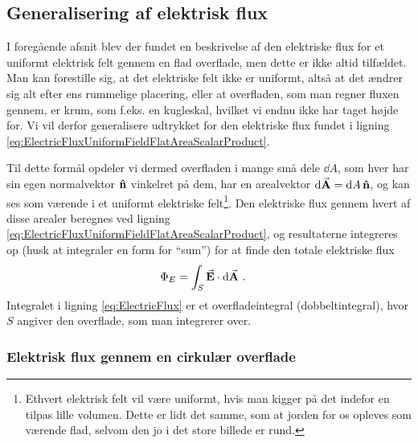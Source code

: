 \subsection{Generalisering af elektrisk flux}

I foregående afsnit blev der fundet en beskrivelse af den elektriske flux for et uniformt elektrisk felt gennem en flad overflade, men dette er ikke altid tilfældet. Man kan forestille sig, at det elektriske felt ikke er uniformt, altså at det ændrer sig alt efter ens rummelige placering, eller at overfladen, som man regner fluxen gennem, er krum, som f.eks. en kugleskal, hvilket vi endnu ikke har taget højde for. Vi vil derfor generalisere udtrykket for den elektriske flux fundet i ligning \eqref{eq:ElectricFluxUniformFieldFlatAreaScalarProduct}.

Til dette formål opdeler vi dermed overfladen i mange små dele $\dd{A}$, som hver har sin egen normalvektor $\vu{n}$ vinkelret på dem, har en arealvektor $\dd{\va{A}} = \dd{A}\vu{n}$, og kan ses som værende i et uniformt elektriske felt\footnote{Ethvert elektrisk felt vil være uniformt, hvis man kigger på det indefor en tilpas lille volumen. Dette er lidt det samme, som at jorden for os opleves som værende flad, selvom den jo i det store billede er rund.}. Den elektriske flux gennem hvert af disse arealer beregnes ved ligning \eqref{eq:ElectricFluxUniformFieldFlatAreaScalarProduct}, og resultaterne integreres op (husk at integraler en form for ``sum'') for at finde den totale elektriske flux
\begin{align} \label{eq:ElectricFlux}
	\Phi_E &= \int_S \va{E} \cdot \dd{\va{A}} \, .
\end{align}
Integralet i ligning \eqref{eq:ElectricFlux} er et overfladeintegral (dobbeltintegral), hvor $S$ angiver den overflade, som man integrerer over.

\subsubsection{Elektrisk flux gennem en cirkulær overflade}

